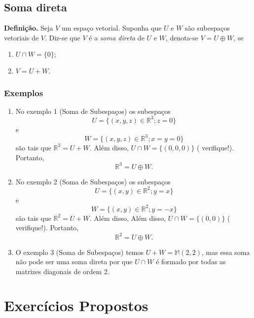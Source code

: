 \subsection{Soma direta}

\textbf{Definição.}  Seja  $V$ um espaço vetorial. Suponha que $U$ e $W$ são  subespaços vetoriais de $V$.  Diz-se que $V$ é a \textit{soma direta } de $U$ e $W$, denota-se $V=U\oplus W$, se
\begin{enumerate}[label=(\roman*)]
\item $U \cap W =\{0\}$;
\item $V=U+W$.
\end{enumerate}

\subsubsection{\textbf{Exemplos}}
\begin{enumerate}
\item No exemplo 1 (Soma de Subespaços) os subespaços  $$ U= \{(x,y,z) \in \mathbb{R}^3 ; z=0\} $$ e  $$ W= \{(x,y,z) \in \mathbb{R}^3 ; x=y=0\}$$  são tais que  $\mathbb{R}^3=U+W$. Além disso, $U \cap W =\{ (0,0,0) \}$ ( verifique!). Portanto, $$ \mathbb{R}^3 =U\oplus W.$$

\item  No exemplo 2 (Soma de Subespaços) os subespaços $$ U= \{(x,y) \in \mathbb{R}^2 ; y=x\} $$ e  $$ W= \{(x,y) \in \mathbb{R}^2 ; y=-x\}$$ são tais que
$\mathbb{R}^2 = U+W$. Além disso, Além disso, $U \cap W =\{ (0,0) \}$ ( verifique!). Portanto, $$ \mathbb{R}^2 =U\oplus W.$$

\item O exemplo 3  (Soma de Subespaços)  temos $ U+W=\mathbb{M}(2,2)$, mas essa soma não pode ser uma soma direta por que $U \cap W $ é formado por todas as matrizes diagonais de ordem 2.

\end{enumerate}






\section{ Exercícios Propostos}


